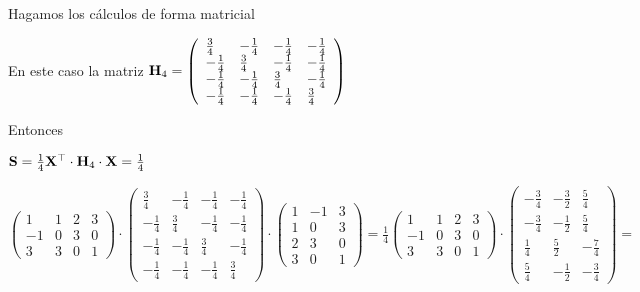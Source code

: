 \begin{frame}
Hagamos los cálculos de forma matricial

En este caso la matriz $\mathbf{H}_4=\left(
\begin{array}{llll}
 \frac{3}{4} & -\frac{1}{4} & -\frac{1}{4} &
   -\frac{1}{4} \\
 -\frac{1}{4} & \frac{3}{4} & -\frac{1}{4} &
   -\frac{1}{4} \\
 -\frac{1}{4} & -\frac{1}{4} & \frac{3}{4} &
   -\frac{1}{4} \\
 -\frac{1}{4} & -\frac{1}{4} & -\frac{1}{4} &
   \frac{3}{4}
\end{array}
\right)$

 
Entonces 

$\mathbf{S}=\frac{1}{4} \mathbf{X}^\top\cdot \mathbf{H}_4\cdot \mathbf{X}=\frac{1}{4}$

$\left(
\begin{array}{llll}
 1 & 1 & 2 & 3 \\
 -1 & 0 & 3 & 0 \\
 3 & 3 & 0 & 1
\end{array}
\right)\cdot 
\left(
\begin{array}{llll}
 \frac{3}{4} & -\frac{1}{4} & -\frac{1}{4} &
   -\frac{1}{4} \\
 -\frac{1}{4} & \frac{3}{4} & -\frac{1}{4} &
   -\frac{1}{4} \\
 -\frac{1}{4} & -\frac{1}{4} & \frac{3}{4} &
   -\frac{1}{4} \\
 -\frac{1}{4} & -\frac{1}{4} & -\frac{1}{4} &
   \frac{3}{4}
\end{array}
\right)
\cdot 
\left(
\begin{array}{lll}
 1 & -1 & 3 \\
 1 & 0 & 3 \\
 2 & 3 & 0 \\
 3 & 0 & 1
\end{array}
\right)=
\frac{1}{4}\left(
\begin{array}{llll}
 1 & 1 & 2 & 3 \\
 -1 & 0 & 3 & 0 \\
 3 & 3 & 0 & 1
\end{array}
\right)\cdot 
\left(
\begin{array}{lll}
 -\frac{3}{4} & -\frac{3}{2} & \frac{5}{4} \\
 -\frac{3}{4} & -\frac{1}{2} & \frac{5}{4} \\
 \frac{1}{4} & \frac{5}{2} & -\frac{7}{4} \\
 \frac{5}{4} & -\frac{1}{2} & -\frac{3}{4}
\end{array}
\right)=
$


\end{frame}

